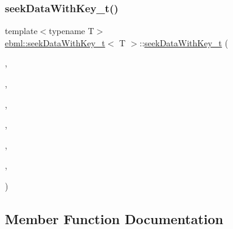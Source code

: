 \mbox{\label{classebml_1_1seekDataWithKey__t_a96571489016319c689963ab35f694e91}} 
\subsubsection{\texorpdfstring{seek\+Data\+With\+Key\+\_\+t()}{seekDataWithKey\_t()}\hspace{0.1cm}{\footnotesize\ttfamily [6/6]}}
{\footnotesize\ttfamily template$<$typename T$>$ \\
\mbox{\hyperlink{classebml_1_1seekDataWithKey__t}{ebml\+::seek\+Data\+With\+Key\+\_\+t}}$<$ T $>$\+::\mbox{\hyperlink{classebml_1_1seekDataWithKey__t}{seek\+Data\+With\+Key\+\_\+t}} (\begin{DoxyParamCaption}\item[{\mbox{\hyperlink{namespaceebml_a86c5f604ddf12a74aa9812e997a58691}{ebml\+I\+D\+\_\+t}}}]{,  }\item[{off\+\_\+t}]{,  }\item[{\mbox{\hyperlink{namespaceebml_a2ccdfb60b23efb51fe07f9d066e23604}{vint\+Width\+\_\+t}}}]{,  }\item[{size\+\_\+t}]{,  }\item[{T \&\&}]{,  }\item[{const \mbox{\hyperlink{namespaceebml_adad533b7705a16bb360fe56380c5e7be}{ebml\+Element\+\_\+sp}} \&}]{,  }\item[{const \mbox{\hyperlink{namespaceebml_adad533b7705a16bb360fe56380c5e7be}{ebml\+Element\+\_\+sp}} \&}]{ }\end{DoxyParamCaption})}



\subsection{Member Function Documentation}
\mbox{\label{classebml_1_1seekDataWithKey__t_a4997f1c29bd331a1e6d8c5293f7d4730}} 
